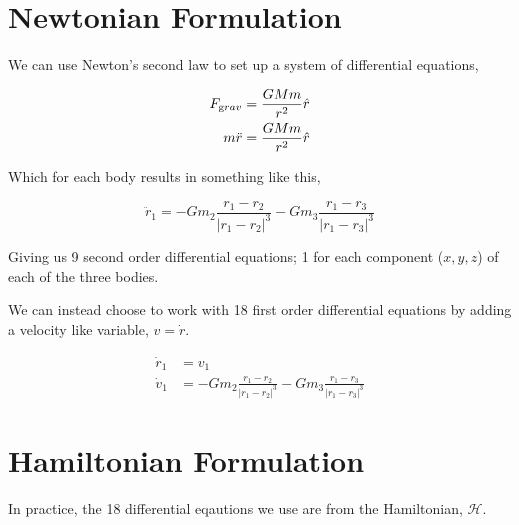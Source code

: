 \documentclass{article}
\newcommand{\norm}[1]{\ensuremath{\left\vert #1 \right \vert}}
\begin{document}
\noindent{}

\section{Newtonian Formulation}

We can use Newton's second law to set up a system of differential equations,

\begin{align}
    F_{\text grav} &= \frac{GMm}{r^2} \hat{r} \\
    m\ddot{r} &= \frac{GMm}{r^2} \hat{r} \\
\end{align}

\noindent Which for each body results in something like this,

\begin{equation}
    \ddot{r}_1 = -Gm_2\frac{r_1 - r_2}{\norm{r_1 - r_2}^3} - Gm_3\frac{r_1 - r_3}{\norm{r_1 - r_3}^3}
\end{equation}

\noindent Giving us 9 second order differential equations; 1 for each component ($x, y, z$) of each of the three bodies.


We can instead choose to work with 18 first order differential equations by adding a velocity like variable, $v = \dot{r}$.

\begin{align}
    \dot{r}_1 &= v_1 \\
    \dot{v}_1 &= -Gm_2\frac{r_1 - r_2}{\norm{r_1 - r_2}^3} - Gm_3\frac{r_1 - r_3}{\norm{r_1 - r_3}^3}
\end{align}

\section{Hamiltonian Formulation}

In practice, the 18 differential eqautions we use are from the Hamiltonian, $\mathcal{H}$.
\end{document}
